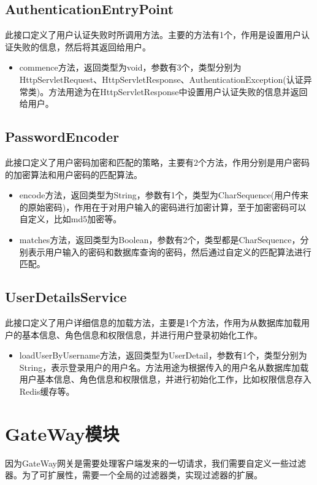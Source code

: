 \subsection{AuthenticationEntryPoint}
此接口定义了用户认证失败时所调用方法。主要的方法有1个，作用是设置用户认证失败的信息，然后将其返回给用户。
\begin{itemize}
    \item commence方法，返回类型为void，参数有3个，类型分别为HttpServletRequest、HttpServletResponse、AuthenticationException(认证异常类)。方法用途为在HttpServletResponse中设置用户认证失败的信息并返回给用户。
\end{itemize}

\subsection{PasswordEncoder}
此接口定义了用户密码加密和匹配的策略，主要有2个方法，作用分别是用户密码的加密算法和用户密码的匹配算法。
\begin{itemize}
    \item encode方法，返回类型为String，参数有1个，类型为CharSequence(用户传来的原始密码)，作用在于对用户输入的密码进行加密计算，至于加密密码可以自定义，比如md5加密等。
    \item matches方法，返回类型为Boolean，参数有2个，类型都是CharSequence，分别表示用户输入的密码和数据库查询的密码，然后通过自定义的匹配算法进行匹配。
\end{itemize}

\subsection{UserDetailsService}
此接口定义了用户详细信息的加载方法，主要是1个方法，作用为从数据库加载用户的基本信息、角色信息和权限信息，并进行用户登录初始化工作。
\begin{itemize}
    \item loadUserByUsername方法，返回类型为UserDetail，参数有1个，类型分别为String，表示登录用户的用户名。方法用途为根据传入的用户名从数据库加载用户基本信息、角色信息和权限信息，并进行初始化工作，比如权限信息存入Redis缓存等。
\end{itemize}

\section{GateWay模块}
因为GateWay网关是需要处理客户端发来的一切请求，我们需要自定义一些过滤器。为了可扩展性，需要一个全局的过滤器类，实现过滤器的扩展。

